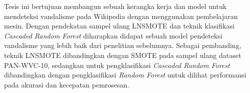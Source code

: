 Tesis ini bertujuan membangun sebuah kerangka kerja dan model untuk mendeteksi
vandalisme pada Wikipedia dengan menggunakan pembelajaran mesin.
Dengan pendekatan sampel ulang LNSMOTE dan teknik klasifikasi \textit{Cascaded
Random Forest} diharapkan didapat sebuah model pendeteksi vandalisme yang
lebih baik dari penelitian sebelumnya.
Sebagai pembanding, teknik LNSMOTE dibandingkan dengan SMOTE pada sampel ulang
dataset PAN-WVC-10, sedangkan untuk pengklasifikasi \textit{Cascaded Random
Forest} dibandingkan dengan pengklasifikasi \textit{Random Forest} untuk
dilihat performansi pada akurasi dan kecepatan pemrosesan.
